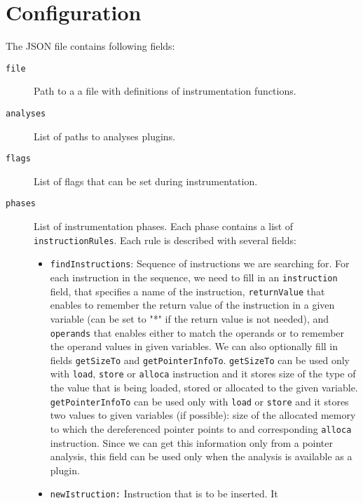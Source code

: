 \section{Configuration}\label{sec:config}


The JSON file contains following fields:

\medskip
\begin{description}
\item[\texttt{file}] Path to a a file with definitions of instrumentation functions.
\item[\texttt{analyses}] List of paths to analyses plugins.
\item[\texttt{flags}] List of flags that can be set during instrumentation.
\item[\texttt{phases}] List of instrumentation phases. Each phase contains a
  list of \texttt{instructionRules}. Each rule is described with several fields:
  \begin{itemize}
    \item \texttt{findInstructions}: Sequence of instructions we are searching
    for. For each instruction in the sequence, we need to fill in an
        \texttt{instruction} field, that specifies a name of the instruction,
        \texttt{returnValue} that enables to remember the return value of the
        instruction in a given variable (can be set to "*" if the return value
        is not needed), and \texttt{operands} that enables either to match the
        operands or to remember the operand values in given variables. We can
        also optionally fill in fields \texttt{getSizeTo} and
        \texttt{getPointerInfoTo}. \texttt{getSizeTo} can be used only with
        \texttt{load}, \texttt{store} or \texttt{alloca} instruction and it
        stores size of the type of the value that is being loaded, stored or
        allocated to the given variable. \texttt{getPointerInfoTo} can be used
        only with \texttt{load} or \texttt{store} and it stores two values to
        given variables (if possible): size of the allocated memory to which
        the dereferenced pointer points to and corresponding \texttt{alloca}
        instruction. Since we can get this information only from a pointer
        analysis, this field can be used only when the analysis is available as
        a plugin.
    \item \texttt{newIstruction:} Instruction that is to be inserted. It

\end{itemize}
\end{description}
